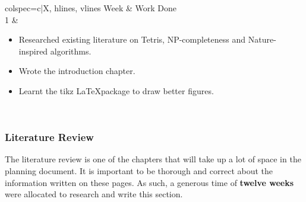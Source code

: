 \documentclass[a4paper, 12pt]{extreport}
\begin{document}
	\begin{longtblr}[
		caption = Weekly breakdown of work done for Introduction Chapter.
		]{colspec={c|X}, hlines, vlines}
		Week & Work Done \\
		1 & \begin{varwidth}[t]{\linewidth}
			\begin{itemize}[topsep=0pt,parsep=0pt]
				\item Researched existing literature on Tetris, NP-completeness and Nature-inspired algorithms.
				\item Wrote the introduction chapter.
				\item Learnt the tikz \LaTeX package to draw better figures.
			\end{itemize}
		\end{varwidth}\\
	\end{longtblr}
	
	\subsubsection{Literature Review}
	\label{sec:litrev}
	
	The literature review is one of the chapters that will take up a lot of space in the planning document. It is important to be thorough and correct about the information written on these pages. As such, a generous time of \textbf{twelve weeks} were allocated to research and write this section.
	
\end{document}
